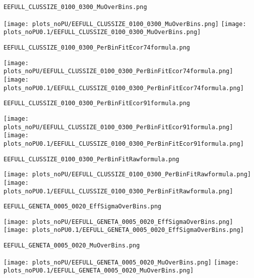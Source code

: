 \begin{frame}[fragile]
\begin{verbatim}
EEFULL_CLUSSIZE_0100_0300_MuOverBins.png
\end{verbatim}
\texttt{[image: plots\_noPU/EEFULL\_CLUSSIZE\_0100\_0300\_MuOverBins.png]}
\texttt{[image: plots\_noPU0.1/EEFULL\_CLUSSIZE\_0100\_0300\_MuOverBins.png]}
\end{frame}
\begin{frame}[fragile]
\begin{verbatim}
EEFULL_CLUSSIZE_0100_0300_PerBinFitEcor74formula.png
\end{verbatim}
\texttt{[image: plots\_noPU/EEFULL\_CLUSSIZE\_0100\_0300\_PerBinFitEcor74formula.png]}
\texttt{[image: plots\_noPU0.1/EEFULL\_CLUSSIZE\_0100\_0300\_PerBinFitEcor74formula.png]}
\end{frame}
\begin{frame}[fragile]
\begin{verbatim}
EEFULL_CLUSSIZE_0100_0300_PerBinFitEcor91formula.png
\end{verbatim}
\texttt{[image: plots\_noPU/EEFULL\_CLUSSIZE\_0100\_0300\_PerBinFitEcor91formula.png]}
\texttt{[image: plots\_noPU0.1/EEFULL\_CLUSSIZE\_0100\_0300\_PerBinFitEcor91formula.png]}
\end{frame}
\begin{frame}[fragile]
\begin{verbatim}
EEFULL_CLUSSIZE_0100_0300_PerBinFitRawformula.png
\end{verbatim}
\texttt{[image: plots\_noPU/EEFULL\_CLUSSIZE\_0100\_0300\_PerBinFitRawformula.png]}
\texttt{[image: plots\_noPU0.1/EEFULL\_CLUSSIZE\_0100\_0300\_PerBinFitRawformula.png]}
\end{frame}
\begin{frame}[fragile]
\begin{verbatim}
EEFULL_GENETA_0005_0020_EffSigmaOverBins.png
\end{verbatim}
\texttt{[image: plots\_noPU/EEFULL\_GENETA\_0005\_0020\_EffSigmaOverBins.png]}
\texttt{[image: plots\_noPU0.1/EEFULL\_GENETA\_0005\_0020\_EffSigmaOverBins.png]}
\end{frame}
\begin{frame}[fragile]
\begin{verbatim}
EEFULL_GENETA_0005_0020_MuOverBins.png
\end{verbatim}
\texttt{[image: plots\_noPU/EEFULL\_GENETA\_0005\_0020\_MuOverBins.png]}
\texttt{[image: plots\_noPU0.1/EEFULL\_GENETA\_0005\_0020\_MuOverBins.png]}
\end{frame}
